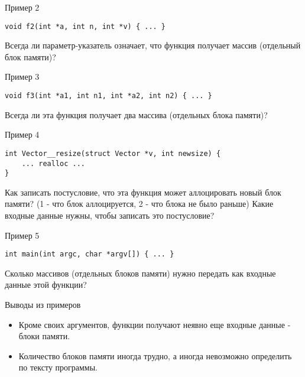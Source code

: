 \documentclass[hyperref={unicode=true}]{beamer}
\begin{document}
    \begin{frame}[fragile]{Пример 2}
    \begin{lstlisting}
void f2(int *a, int n, int *v) { ... }
    \end{lstlisting}
    Всегда ли параметр-указатель означает, что функция
    получает массив (отдельный блок памяти)?
    \end{frame}

    \begin{frame}[fragile]{Пример 3}
    \begin{lstlisting}
void f3(int *a1, int n1, int *a2, int n2) { ... }
    \end{lstlisting}
    Всегда ли эта функция получает два массива
    (отдельных блока памяти)?
    \end{frame}

    \begin{frame}[fragile]{Пример 4}
    \begin{lstlisting}
int Vector__resize(struct Vector *v, int newsize) {
    ... realloc ...
}
    \end{lstlisting}
    Как записать постусловие, что эта функция может
    аллоцировать новый блок памяти? (1 - что блок
    аллоцируется, 2 - что блока не было раньше)
    Какие входные данные нужны, чтобы записать это
    постусловие?
    \end{frame}

    \begin{frame}[fragile]{Пример 5}
    \begin{lstlisting}
int main(int argc, char *argv[]) { ... }
    \end{lstlisting}
    Сколько массивов (отдельных блоков памяти) нужно
    передать как входные данные этой функции?
    \end{frame}

    \begin{frame}{Выводы из примеров}
    \begin{itemize}
    \item
    Кроме своих аргументов, функции получают неявно
    еще входные данные - блоки памяти.
    \item
    Количество блоков памяти иногда трудно, а иногда
    невозможно определить по тексту программы.
    \end{itemize}
    \end{frame}
\end{document}

